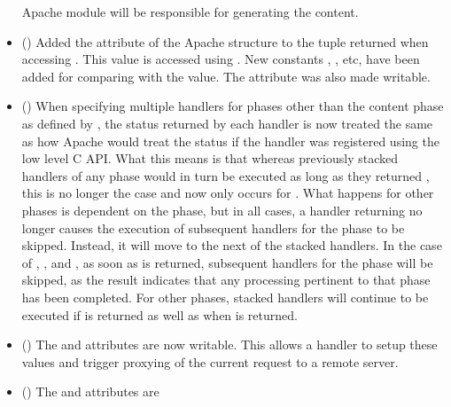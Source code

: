 \begin{itemize}
      Apache module will be responsible for generating the content.
    \item
      ()
      Added the  attribute of the Apache 
      structure to the tuple returned when accessing .
      This value is accessed using .
      New constants , ,
       etc, have been added for comparing with the
       value. The  attribute
      was also made writable.
    \item
      ()
      When specifying multiple handlers for phases other than the content
      phase as defined by , the status returned by each
      handler is now treated the same as how Apache would treat the status
      if the handler was registered using the low level C API. What this
      means is that whereas previously stacked handlers of any phase would
      in turn be executed as long as they returned , this
      is no longer the case and now only occurs for .
      What happens for other phases is dependent on the phase, but in all
      cases, a handler returning  no longer causes
      the execution of subsequent handlers for the phase to be skipped.
      Instead, it will move to the next of the stacked handlers. In the
      case of , ,
       and , as soon
      as  is returned, subsequent handlers for the phase
      will be skipped, as the result indicates that any processing pertinent
      to that phase has been completed. For other phases, stacked handlers
      will continue to be executed if  is returned as well
      as when  is returned.
    \item
      ()
      The  and  attributes are now writable.
      This allows a handler to setup these values and trigger proxying of the
      current request to a remote server.
    \item
      ()
      The  and  attributes are

\end{itemize}
